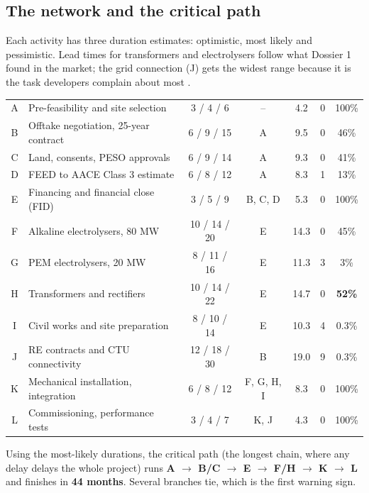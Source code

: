 \subsection{The network and the critical path}
Each activity has three duration estimates: optimistic, most likely and pessimistic. Lead times for transformers and electrolysers follow what Dossier 1 found in the market; the grid connection (J) gets the widest range because it is the task developers complain about most \cite{gemini2026}. \estd

\begin{center}\tablefont
\begin{tabularx}{\textwidth}{@{}c L c c c c c@{}}
\toprule
{} &  &  &  &  &  & \\ \midrule
A & Pre-feasibility and site selection & 3 / 4 / 6 & -- & 4.2 & 0 & 100\%\\
B & Offtake negotiation, 25-year contract & 6 / 9 / 15 & A & 9.5 & 0 & 46\%\\
C & Land, consents, PESO approvals & 6 / 9 / 14 & A & 9.3 & 0 & 41\%\\
D & FEED to AACE Class 3 estimate \cite{epcland} & 6 / 8 / 12 & A & 8.3 & 1 & 13\%\\
E & Financing and financial close (FID) & 3 / 5 / 9 & B, C, D & 5.3 & 0 & 100\%\\
F & Alkaline electrolysers, 80 MW & 10 / 14 / 20 & E & 14.3 & 0 & 45\%\\
G & PEM electrolysers, 20 MW & 8 / 11 / 16 & E & 11.3 & 3 & 3\%\\
H & Transformers and rectifiers & 10 / 14 / 22 & E & 14.7 & 0 & \textbf{52\%}\\
I & Civil works and site preparation & 8 / 10 / 14 & E & 10.3 & 4 & 0.3\%\\
J & RE contracts and CTU connectivity & 12 / 18 / 30 & B & 19.0 & 9 & 0.3\%\\
K & Mechanical installation, integration & 6 / 8 / 12 & F, G, H, I & 8.3 & 0 & 100\%\\
L & Commissioning, performance tests & 3 / 4 / 7 & K, J & 4.3 & 0 & 100\%\\
\bottomrule
\end{tabularx}
\end{center}

Using the most-likely durations, the critical path (the longest chain, where any delay delays the whole project) runs \textbf{A $\rightarrow$ B/C $\rightarrow$ E $\rightarrow$ F/H $\rightarrow$ K $\rightarrow$ L} and finishes in \textbf{44 months}. Several branches tie, which is the first warning sign.

